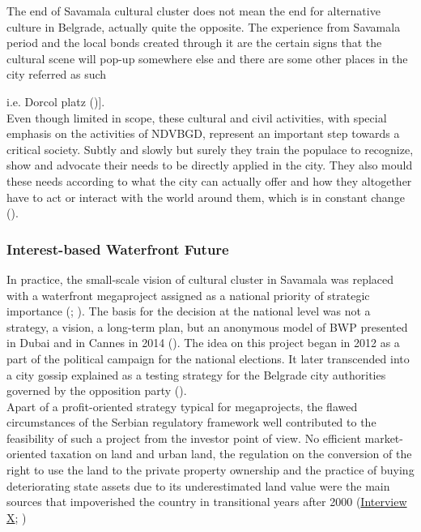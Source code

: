 \documentclass[11pt]{report}
\begin{document}
The end of Savamala cultural cluster does not mean the end for alternative culture in Belgrade, actually quite the opposite. The experience from Savamala period and the local bonds created through it are the certain signs that the cultural scene will pop-up somewhere else and there are some other places in the city referred as such {i.e. Dorcol platz (\cite{ref media})].
\\

Even though limited in scope, these cultural and civil activities, with special emphasis on the activities of NDVBGD, represent an important step towards a critical society.
Subtly and slowly but surely they train the populace to recognize, show and advocate their needs to be directly applied in the city.
They also mould these needs according to what the city can actually offer and how they altogether have to act or interact with the world around them, which is in constant change (\href{Harvey}{\cite{Harvey2003}}). 

\subsubsection{Interest-based Waterfront Future}

In practice, the small-scale vision of cultural cluster in Savamala was replaced with a waterfront megaproject assigned as a national priority of strategic importance (\href{Decision}{\cite{DecisionOfGovernment2014}}; \href{Ordinance}{\cite{Ordinance2015}}). 
The basis for the decision at the national level was not a strategy, a vision, a long-term plan, but an anonymous model of BWP presented in Dubai and in Cannes in 2014 (\href{Politika}{\cite{(Politika, 13. mart 2014)}}).
The idea on this project began in 2012 as a part of the political campaign for the national elections.
It later transcended into a city gossip explained as a testing strategy for the Belgrade city authorities governed by the opposition party (\href{Vreme}{\cite{ref Vreme Djilas}}). 
\\

Apart of a profit-oriented strategy typical for megaprojects, the flawed circumstances of the Serbian regulatory framework well contributed to the feasibility of such a project from the investor point of view.
No efficient market-oriented taxation on land and urban land, the regulation on the conversion of the right to use the land to the private property ownership and the practice of buying deteriorating state assets due to its underestimated land value were the main sources that impoverished the country in transitional years after 2000
(\href{InterviewX}{Interview X}; \href{Zekovic}{\cite{????????}})
\\

}
\end{document}
